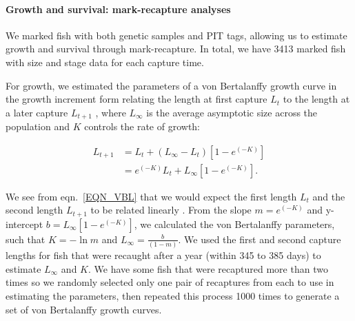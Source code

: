 \documentclass[12pt, oneside]{article}   	%
\begin{document}
\paragraph*{Growth and survival: mark-recapture analyses}

We marked fish with both genetic samples and PIT tags, allowing us to estimate growth and survival through mark-recapture. In total, we have 3413 marked fish with size and stage data for each capture time. 

For growth, we estimated the parameters of a von Bertalanffy growth curve \citep{fabens1965properties} in the growth increment form relating the length at first capture $L_t$ to the length at a later capture $L_{t+1}$ \citep{hart2009estimating}, where $L_\infty$ is the average asymptotic size across the population and $K$ controls the rate of growth: %

\begin{equation} \label{EQN_VBL} 
\begin{split}
L_{t+1} & = L_t + (L_\infty - L_t)[1 - e^{(-K)}] \\
 & = e^{(-K)}L_t + L_\infty[1 - e^{(-K)}].
\end{split}
\end{equation}

We see from eqn.\ \ref{EQN_VBL} that we would expect the first length $L_t$ and the second length $L_{t+1}$ to be related linearly \citep{hart2009estimating}. From the slope $m = e^{(-K)}$ and y-intercept $b =  L_\infty[1 - e^{(-K)}]$, we calculated the von Bertalanffy parameters, such that $K = -\ln m$ and $L_\infty = \frac{b}{(1-m)}$. We used the first and second capture lengths for fish that were recaught after a year (within 345 to 385 days) to estimate $L_\infty$ and $K$. We have some fish that were recaptured more than two times so we randomly selected only one pair of recaptures from each to use in estimating the parameters, then repeated this process 1000 times to generate a set of von Bertalanffy growth curves. 
\end{document}
